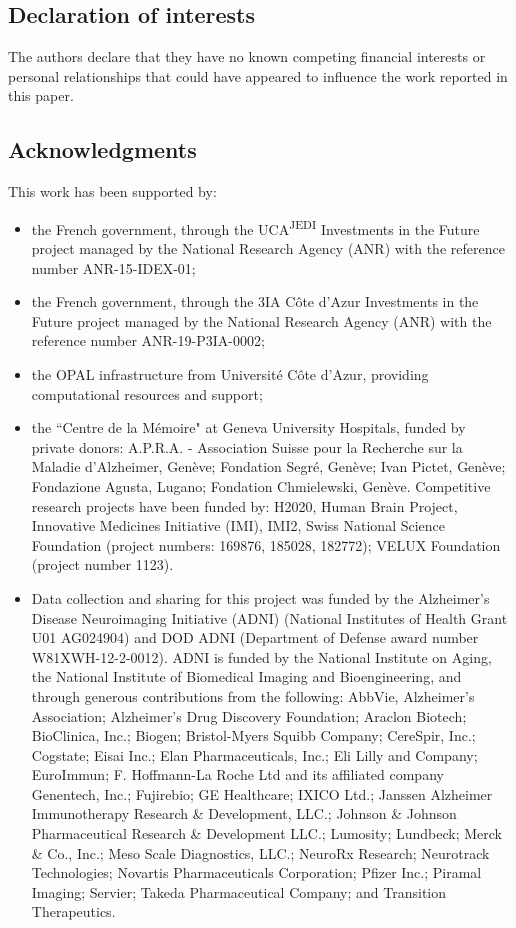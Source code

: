 \subsection*{Declaration of interests}
The authors declare that they have no known competing financial interests or personal relationships that could have appeared to influence the work reported in this paper.

\subsection*{Acknowledgments}
\label{sec:ack}

This work has been supported by:
\begin{itemize}
%
\item the French government, through the UCA\textsuperscript{JEDI} Investments in the Future project managed by the National Research Agency (ANR) with the reference number ANR-15-IDEX-01;
%
\item the French government, through the 3IA Côte d'Azur Investments in the Future project managed by the National Research Agency (ANR) with the reference number ANR-19-P3IA-0002;
%
\item the OPAL infrastructure from Université Côte d'Azur, providing computational resources and support;
%
\item the ``Centre de la Mémoire" at Geneva University Hospitals, funded by private donors:
A.P.R.A. - Association Suisse pour la Recherche sur la Maladie d’Alzheimer, Genève;
Fondation Segré, Genève;
Ivan Pictet, Genève;
Fondazione Agusta, Lugano;
Fondation Chmielewski, Genève.
Competitive research projects have been funded by: H2020, Human Brain Project, Innovative Medicines Initiative (IMI), IMI2, Swiss National Science Foundation (project numbers: 169876, 185028, 182772);
VELUX Foundation (project number 1123).
%
\item Data collection and sharing for this project was funded by the Alzheimer's Disease Neuroimaging Initiative (ADNI) (National Institutes of Health Grant U01 AG024904) and DOD ADNI (Department of Defense award number W81XWH-12-2-0012).
ADNI is funded by the National Institute on Aging, the National Institute of Biomedical Imaging and Bioengineering, and through generous contributions from the following:
AbbVie, Alzheimer's Association; Alzheimer's Drug Discovery Foundation; Araclon Biotech; BioClinica, Inc.; Biogen; Bristol-Myers Squibb Company; CereSpir, Inc.; Cogstate; Eisai Inc.; Elan Pharmaceuticals, Inc.; Eli Lilly and Company; EuroImmun; F. Hoffmann-La Roche Ltd and its affiliated company Genentech, Inc.; Fujirebio; GE Healthcare; IXICO Ltd.; Janssen Alzheimer Immunotherapy Research \& Development, LLC.; Johnson \& Johnson Pharmaceutical Research \& Development LLC.; Lumosity; Lundbeck; Merck \& Co., Inc.; Meso Scale Diagnostics, LLC.; NeuroRx Research; Neurotrack Technologies; Novartis Pharmaceuticals Corporation; Pfizer Inc.; Piramal Imaging; Servier; Takeda Pharmaceutical Company; and Transition Therapeutics.

\end{itemize}
